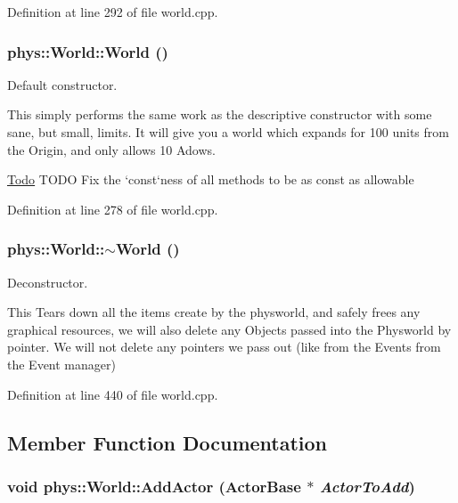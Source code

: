 Definition at line 292 of file world.cpp.

\hypertarget{classphys_1_1World_a7f762724406c874250c3dc8910a1e695}{
\subsubsection[{World}]{\setlength{\rightskip}{0pt plus 5cm}phys::World::World ()}}
\label{da/ddf/classphys_1_1World_a7f762724406c874250c3dc8910a1e695}


Default constructor. 

This simply performs the same work as the descriptive constructor with some sane, but small, limits. It will give you a world which expands for 100 units from the Origin, and only allows 10 Adows.

\begin{Desc}
\item[\hyperlink{todo__todo000018}{Todo}]TODO Fix the `const`ness of all methods to be as const as allowable \end{Desc}


Definition at line 278 of file world.cpp.

\hypertarget{classphys_1_1World_a8b2c74c7e5d5ce3c46a814e183a7aff1}{
\subsubsection[{$\sim$World}]{\setlength{\rightskip}{0pt plus 5cm}phys::World::$\sim$World ()}}
\label{da/ddf/classphys_1_1World_a8b2c74c7e5d5ce3c46a814e183a7aff1}


Deconstructor. 

This Tears down all the items create by the physworld, and safely frees any graphical resources, we will also delete any Objects passed into the Physworld by pointer. We will not delete any pointers we pass out (like from the Events from the Event manager) 

Definition at line 440 of file world.cpp.



\subsection{Member Function Documentation}
\hypertarget{classphys_1_1World_a0fec41ef68b7bb1443aab927f8277a81}{
\subsubsection[{AddActor}]{\setlength{\rightskip}{0pt plus 5cm}void phys::World::AddActor ({\bf ActorBase} $\ast$ {\em ActorToAdd})}}
\label{da/ddf/classphys_1_1World_a0fec41ef68b7bb1443aab927f8277a81}


